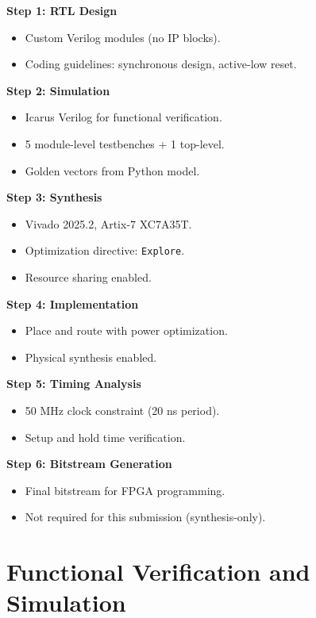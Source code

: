 \documentclass[11pt, a4paper]{article}
\begin{document}
\textbf{Step 1: RTL Design}
\begin{itemize}
    \item Custom Verilog modules (no IP blocks).
    \item Coding guidelines: synchronous design, active-low reset.
\end{itemize}

\textbf{Step 2: Simulation}
\begin{itemize}
    \item Icarus Verilog for functional verification.
    \item 5 module-level testbenches + 1 top-level.
    \item Golden vectors from Python model.
\end{itemize}

\textbf{Step 3: Synthesis}
\begin{itemize}
    \item Vivado 2025.2, Artix-7 XC7A35T.
    \item Optimization directive: \texttt{Explore}.
    \item Resource sharing enabled.
\end{itemize}

\textbf{Step 4: Implementation}
\begin{itemize}
    \item Place and route with power optimization.
    \item Physical synthesis enabled.
\end{itemize}

\textbf{Step 5: Timing Analysis}
\begin{itemize}
    \item 50 MHz clock constraint (20 ns period).
    \item Setup and hold time verification.
\end{itemize}

\textbf{Step 6: Bitstream Generation}
\begin{itemize}
    \item Final bitstream for FPGA programming.
    \item Not required for this submission (synthesis-only).
\end{itemize}

\section{Functional Verification and Simulation}
\end{document}
